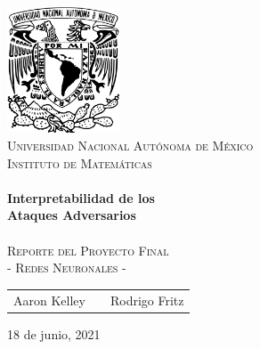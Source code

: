 \begin{titlepage}
    \begin{center}
    \includegraphics[width=0.25\textwidth]{resources/unam_escudo.png}~\\[2cm]
    \textsc{\huge Universidad Nacional Autónoma de México}\\[0.5cm]  
    \textsc{\LARGE Instituto de Matemáticas}\\[2cm]
    
    \HRule \\[0.5cm] 
    {\Huge \bfseries Interpretabilidad de los \\[1cm] Ataques Adversarios} \\[0.3cm] 
    \HRule \\[0.5cm]
    
    \textsc{\LARGE Reporte del Proyecto Final}\\[0.4cm]
    \textsc{\LARGE - Redes Neuronales - }\\[3cm]
    

    {\Large
    \begin{tabular}{ccc}
        Aaron Kelley & \hspace{1.5in} & Rodrigo Fritz
    \end{tabular}
    }
    \vfill

    {\Large 18 de junio, 2021}
    
    \end{center} 
\end{titlepage}